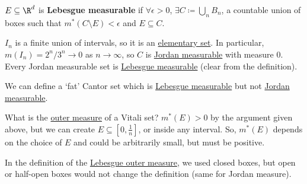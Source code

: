 \documentclass{article}
\newcommand{\1}[1]{\mathbbm{1}_{#1}}
\begin{document}
\begin{defi}
    $E \subseteq \R^d$ is \textbf{Lebesgue measurable} if $\forall \epsilon > 0$, $\exists C \coloneqq \bigcup_{n} B_n$, a countable union of boxes such that $m^*(C \setminus E) < \epsilon$ and $E \subseteq C$.
\end{defi}


\begin{remark}
    $I_n$ is a finite union of intervals, so it is an \hyperlink{def:elemSubs}{elementary set}.
    In particular, $m(I_n) = 2^n / 3^n \to 0$ as $n \to \infty$, so $C$ is \hyperlink{def:jMeasurable}{Jordan measurable} with measure $0$.
    Every Jordan measurable set is \hyperlink{def:lebMAble}{Lebesgue measurable} (clear from the definition).
\end{remark}

We can define a `fat' Cantor set which is \hyperlink{def:lebMAble}{Lebesgue measurable} but not \hyperlink{def:jMeasurable}{Jordan measurable}.

\begin{remark}
    What is the \hyperlink{def:lebOutMeas}{outer measure} of a Vitali set?
    $m^*(E) > 0$ by the argument given above, but we can create $E \subseteq [0, \frac1n]$, or inside any interval. So, $m^*(E)$ depends on the choice of $E$ and could be arbitrarily small, but must be positive.
\end{remark}

\begin{remark}
    In the definition of the \hyperlink{def:lebOutMeas}{Lebesgue outer measure}, we used closed boxes, but open or half-open boxes would not change the definition (same for Jordan measure).
\end{remark}
\end{document}
